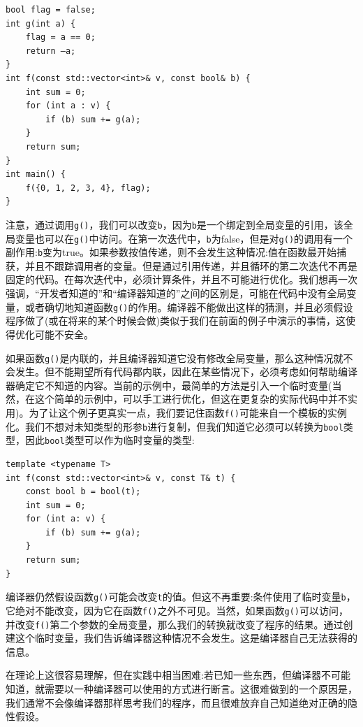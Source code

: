 \begin{lstlisting}[style=styleCXX]
bool flag = false;
int g(int a) {
	flag = a == 0;
	return –a;
}
int f(const std::vector<int>& v, const bool& b) {
	int sum = 0;
	for (int a : v) {
		if (b) sum += g(a);
	}
	return sum;
} 
int main() {
	f({0, 1, 2, 3, 4}, flag);
}
\end{lstlisting}

注意，通过调用\texttt{g()}，我们可以改变\texttt{b}，因为\texttt{b}是一个绑定到全局变量的引用，该全局变量也可以在\texttt{g()}中访问。在第一次迭代中，\texttt{b}为false，但是对\texttt{g()}的调用有一个副作用:\texttt{b}变为true。如果参数按值传递，则不会发生这种情况:值在函数最开始捕获，并且不跟踪调用者的变量。但是通过引用传递，并且循环的第二次迭代不再是固定的代码。在每次迭代中，必须计算条件，并且不可能进行优化。我们想再一次强调，“开发者知道的”和“编译器知道的”之间的区别是，可能在代码中没有全局变量，或者确切地知道函数\texttt{g()}的作用。编译器不能做出这样的猜测，并且必须假设程序做了(或在将来的某个时候会做)类似于我们在前面的例子中演示的事情，这使得优化可能不安全。 

如果函数\texttt{g()}是内联的，并且编译器知道它没有修改全局变量，那么这种情况就不会发生。但不能期望所有代码都内联，因此在某些情况下，必须考虑如何帮助编译器确定它不知道的内容。当前的示例中，最简单的方法是引入一个临时变量(当然，在这个简单的示例中，可以手工进行优化，但这在更复杂的实际代码中并不实用)。为了让这个例子更真实一点，我们要记住函数\texttt{f()}可能来自一个模板的实例化。我们不想对未知类型的形参\texttt{b}进行复制，但我们知道它必须可以转换为\texttt{bool}类型，因此\texttt{bool}类型可以作为临时变量的类型:

\begin{lstlisting}[style=styleCXX]
template <typename T>
int f(const std::vector<int>& v, const T& t) {
	const bool b = bool(t);
	int sum = 0;
	for (int a: v) {
		if (b) sum += g(a);
	}
	return sum;
} 

\end{lstlisting}

编译器仍然假设函数\texttt{g()}可能会改变\texttt{t}的值。但这不再重要:条件使用了临时变量\texttt{b}，它绝对不能改变，因为它在函数\texttt{f()}之外不可见。当然，如果函数\texttt{g()}可以访问，并改变\texttt{f()}第二个参数的全局变量，那么我们的转换就改变了程序的结果。通过创建这个临时变量，我们告诉编译器这种情况不会发生。这是编译器自己无法获得的信息。 

在理论上这很容易理解，但在实践中相当困难:若已知一些东西，但编译器不可能知道，就需要以一种编译器可以使用的方式进行断言。这很难做到的一个原因是，我们通常不会像编译器那样思考我们的程序，而且很难放弃自己知道绝对正确的隐性假设。 

